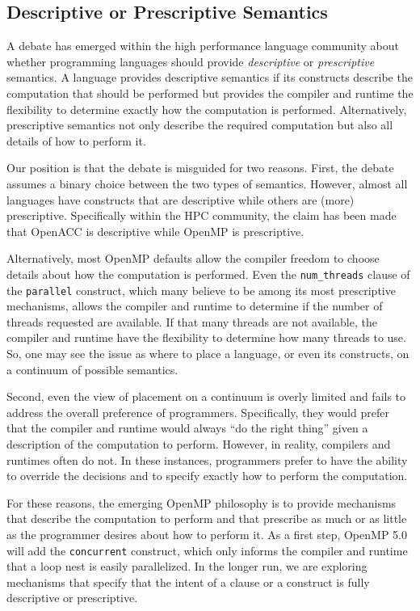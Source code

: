 \subsection{Descriptive or Prescriptive Semantics}
\label{sub:descriptive}

A debate has emerged within the high performance language
community about whether programming languages should 
provide \emph{descriptive} or \emph{prescriptive} semantics. 
A language provides descriptive semantics if its constructs 
describe the computation that should be performed but provides 
the compiler and runtime the flexibility to determine exactly 
how the computation is performed. Alternatively, prescriptive
semantics not only describe the required computation but 
also all details of how to perform it.

Our position is that the debate is misguided for two reasons.
First, the debate assumes a binary choice between the two 
types of semantics. However, almost all languages have constructs 
that are descriptive while others are (more) prescriptive. 
Specifically within the HPC community, the claim has been 
made that OpenACC is descriptive while OpenMP is prescriptive.

Alternatively, most OpenMP defaults allow the compiler freedom
to choose details about how the computation is performed. Even
the \texttt{num\_threads} clause of the \texttt{parallel} construct,
which many believe to be among its most prescriptive mechanisms,
allows the compiler and runtime to determine if the number of
threads requested are available. If that many threads are not
available, the compiler and runtime have the flexibility to
determine how many threads to use. So, one may see the issue 
as where to place a language, or even its constructs, on a 
continuum of possible semantics.

Second, even the view of placement on a continuum is overly
limited and fails to address the overall preference of 
programmers. Specifically, they would prefer that the compiler
and runtime would always ``do the right thing'' given a 
description of the computation to perform. However, in reality,
compilers and runtimes often do not. In these instances,
programmers prefer to have the ability to override the
decisions and to specify exactly how to perform the computation.

For these reasons, the emerging OpenMP philosophy is to provide
mechanisms that describe the computation to perform and that
prescribe as much or as little as the programmer desires about
how to perform it. As a first step, OpenMP 5.0 will add the 
\texttt{concurrent} construct, which only informs the compiler 
and runtime that a loop nest is easily parallelized. In the 
longer run, we are exploring mechanisms that specify that the 
intent of a clause or a construct is fully descriptive or prescriptive.
